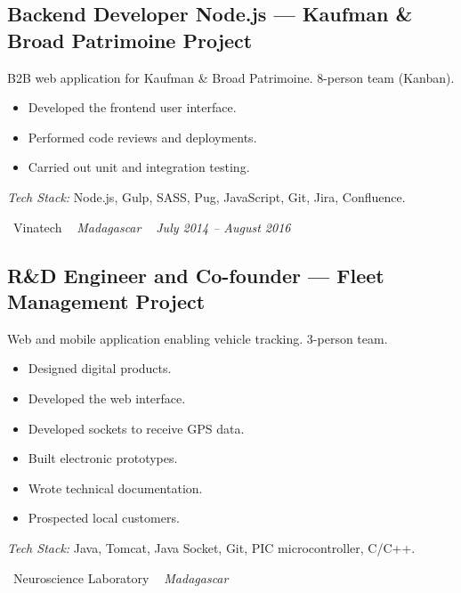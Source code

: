 \documentclass[10pt,a4paper]{article}
\begin{document}
\vspace{6pt}

\subsection*{Backend Developer Node.js --- Kaufman \& Broad Patrimoine Project}
\color{darkgray}
B2B web application for Kaufman \& Broad Patrimoine. 8-person team (Kanban).
\begin{itemize}
  \item Developed the frontend user interface.
  \item Performed code reviews and deployments.
  \item Carried out unit and integration testing.
\end{itemize}
\textit{Tech Stack:} Node.js, Gulp, SASS, Pug, JavaScript, Git, Jira, Confluence.

\vspace{10pt}

\noindent\textcolor{primary}{ \faBuilding\ Vinatech} \quad
\textit{ \small \textcolor{darkgray}{ \faMapMarker\ } Madagascar } \hfill
\textit{ \small \textcolor{darkgray}{ \faCalendar\ } July 2014 -- August 2016 }

\vspace{4pt}

\subsection*{R\&D Engineer and Co-founder --- Fleet Management Project}
\color{darkgray}
Web and mobile application enabling vehicle tracking. 3-person team.
\begin{itemize}
  \item Designed digital products.
  \item Developed the web interface.
  \item Developed sockets to receive GPS data.
  \item Built electronic prototypes.
  \item Wrote technical documentation.
  \item Prospected local customers.
\end{itemize}
\textit{Tech Stack:} Java, Tomcat, Java Socket, Git, PIC microcontroller, C/C++.

\vspace{10pt}

\noindent\textcolor{primary}{ \faBuilding\ Neuroscience Laboratory} \quad
\textit{ \small \textcolor{darkgray}{ \faMapMarker\ } Madagascar }
\end{document}
